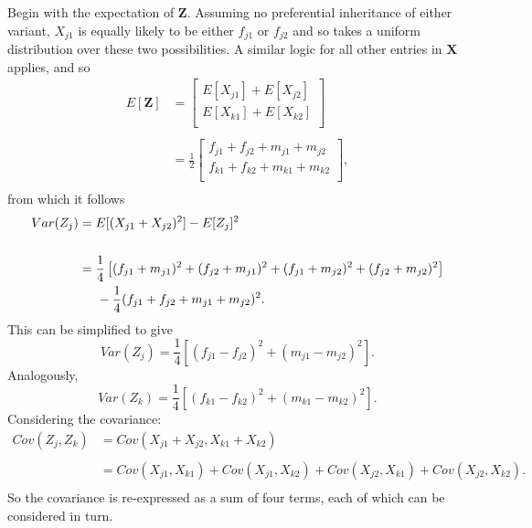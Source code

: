 \documentclass{article}
\newcommand{\ve}[1]{\mathbf{#1}}           %
\newcommand{\m}[1]{\mathbf{#1}}               %
\begin{document}
Begin with the expectation of $\ve{Z}$. Assuming no preferential inheritance of either variant, $X_{j1}$ is equally likely to be either $f_{j1}$ or $f_{j2}$ and so takes a uniform distribution over these two possibilities. A similar logic for all other entries in $\m{X}$ applies, and so
\begin{equation*}
  \begin{split}
    E[\ve{Z}] & = {\begin{bmatrix}
        E[X_{j1}] + E[X_{j2}] \\
        E[X_{k1}] + E[X_{k2}] \\
      \end{bmatrix}} \\
    & \\
    & = {\frac{1}{2}\begin{bmatrix}
        f_{j1} + f_{j2} + m_{j1} + m_{j2} \\
        f_{k1} + f_{k2} + m_{k1} + m_{k2} \\
      \end{bmatrix}}, \\
  \end{split}
\end{equation*}
from which it follows
\begin{equation*}
  \begin{split}
    Var(Z_j) & = E[(X_{j1} + X_{j2})^2] - E[Z_j]^2 \\
    & \\ 
    & = \frac{1}{4}\left [ (f_{j1} + m_{j1})^2 + (f_{j2} + m_{j1})^2 + (f_{j1} + m_{j2})^2 + (f_{j2} + m_{j2})^2 \right ] \\
    & \hspace{0.5cm} - \frac{1}{4}(f_{j1} + f_{j2} + m_{j1} + m_{j2})^2. \\
  \end{split}
\end{equation*}
This can be simplified to give
\begin{equation} \label{eq:z1var}
  Var(Z_j) = \frac{1}{4} \left [ (f_{j1} - f_{j2})^2 + (m_{j1} - m_{j2})^2 \right ].
\end{equation}
Analogously,
\begin{equation} \label{eq:z2var}
  Var(Z_k) = \frac{1}{4} \left [ (f_{k1} - f_{k2})^2 + (m_{k1} - m_{k2})^2 \right ].
\end{equation}
Considering the covariance:
\begin{equation} \label{eq:covstep1}
  \begin{split}
    Cov(Z_j, Z_k) & = Cov(X_{j1} + X_{j2}, X_{k1} + X_{k2}) \\
    & \\
    & =  Cov(X_{j1}, X_{k1}) + Cov(X_{j1}, X_{k2}) + Cov(X_{j2}, X_{k1}) + Cov(X_{j2}, X_{k2}). \\
  \end{split}
\end{equation}
So the covariance is re-expressed as a sum of four terms, each of which can be considered in turn.
\end{document}

